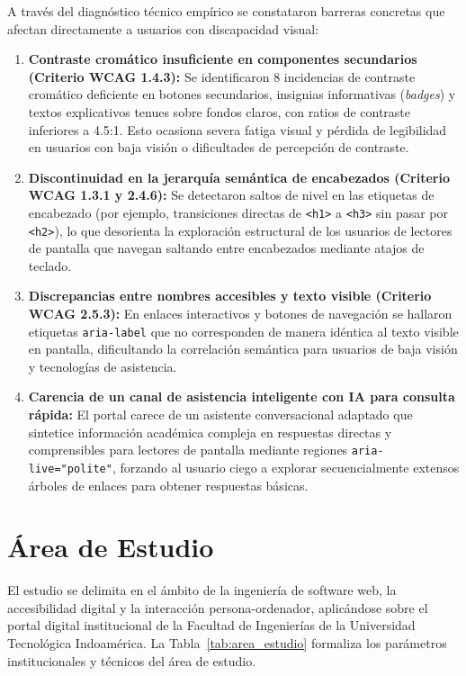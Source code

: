 A través del diagnóstico técnico empírico se constataron barreras concretas que afectan directamente a usuarios con discapacidad visual:
\begin{enumerate}
  \item \textbf{Contraste cromático insuficiente en componentes secundarios (Criterio WCAG 1.4.3):} Se identificaron 8 incidencias de contraste cromático deficiente en botones secundarios, insignias informativas (\textit{badges}) y textos explicativos tenues sobre fondos claros, con ratios de contraste inferiores a 4.5:1. Esto ocasiona severa fatiga visual y pérdida de legibilidad en usuarios con baja visión o dificultades de percepción de contraste.
  \item \textbf{Discontinuidad en la jerarquía semántica de encabezados (Criterio WCAG 1.3.1 y 2.4.6):} Se detectaron saltos de nivel en las etiquetas de encabezado (por ejemplo, transiciones directas de \texttt{<h1>} a \texttt{<h3>} sin pasar por \texttt{<h2>}), lo que desorienta la exploración estructural de los usuarios de lectores de pantalla que navegan saltando entre encabezados mediante atajos de teclado.
  \item \textbf{Discrepancias entre nombres accesibles y texto visible (Criterio WCAG 2.5.3):} En enlaces interactivos y botones de navegación se hallaron etiquetas \texttt{aria-label} que no corresponden de manera idéntica al texto visible en pantalla, dificultando la correlación semántica para usuarios de baja visión y tecnologías de asistencia.
  \item \textbf{Carencia de un canal de asistencia inteligente con IA para consulta rápida:} El portal carece de un asistente conversacional adaptado que sintetice información académica compleja en respuestas directas y comprensibles para lectores de pantalla mediante regiones \texttt{aria-live="polite"}, forzando al usuario ciego a explorar secuencialmente extensos árboles de enlaces para obtener respuestas básicas.
\end{enumerate}

\section{Área de Estudio}
El estudio se delimita en el ámbito de la ingeniería de software web, la accesibilidad digital y la interacción persona-ordenador, aplicándose sobre el portal digital institucional de la Facultad de Ingenierías de la Universidad Tecnológica Indoamérica. La Tabla~\ref{tab:area_estudio} formaliza los parámetros institucionales y técnicos del área de estudio.

